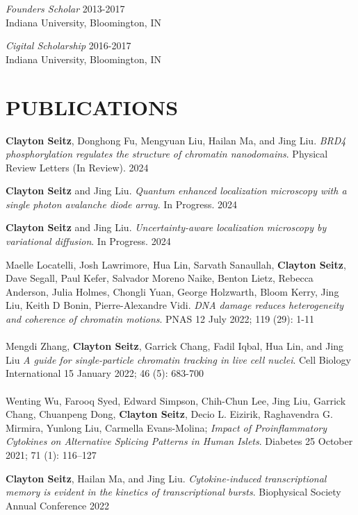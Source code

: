\documentclass[margin, 10pt]{res} %
\begin{document}
\begin{resume}
{\sl Founders Scholar} \hfill 2013-2017 \\
Indiana University, Bloomington, IN 

{\sl Cigital Scholarship} \hfill 2016-2017 \\
Indiana University, Bloomington, IN 

\section{PUBLICATIONS}

\textbf{Clayton Seitz}\textsuperscript{\textdagger}, Donghong Fu\textsuperscript{\textdagger}, Mengyuan Liu, Hailan Ma, and Jing Liu. \textit{BRD4 phosphorylation regulates the structure of chromatin nanodomains}. Physical Review Letters (In Review). 2024

\textbf{Clayton Seitz} and Jing Liu. \textit{Quantum enhanced localization microscopy with a single photon avalanche diode array}. In Progress. 2024

\textbf{Clayton Seitz} and Jing Liu. \textit{Uncertainty-aware localization microscopy by variational diffusion}. In Progress. 2024

Maelle Locatelli\textsuperscript{\textdagger}, Josh Lawrimore\textsuperscript{\textdagger}, Hua Lin\textsuperscript{\textdagger}, Sarvath Sanaullah, \textbf{Clayton Seitz}, Dave Segall, Paul Kefer, Salvador Moreno Naike, Benton Lietz, Rebecca Anderson, Julia Holmes, Chongli Yuan, George Holzwarth, Bloom Kerry, Jing Liu, Keith D Bonin, Pierre-Alexandre Vidi. \textit{DNA damage reduces heterogeneity and coherence of chromatin motions}. PNAS 12 July 2022; 119 (29): 1-11
\\
\\
Mengdi Zhang, \textbf{Clayton Seitz}, Garrick Chang, Fadil Iqbal, Hua Lin, and Jing Liu \textit{A guide for single-particle chromatin tracking in live cell nuclei}. Cell Biology International 15 January 2022; 46 (5): 683-700
\\
\\
Wenting Wu, Farooq Syed, Edward Simpson, Chih-Chun Lee, Jing Liu, Garrick Chang, Chuanpeng Dong, \textbf{Clayton Seitz}, Decio L. Eizirik, Raghavendra G. Mirmira, Yunlong Liu, Carmella Evans-Molina; \textit{Impact of Proinflammatory Cytokines on Alternative Splicing Patterns in Human Islets}. Diabetes 25 October 2021; 71 (1): 116–127

\textbf{Clayton Seitz}, Hailan Ma, and Jing Liu. \textit{Cytokine-induced transcriptional memory is evident in the kinetics of transcriptional bursts}. Biophysical Society Annual Conference 2022



\end{resume}
\end{document}
